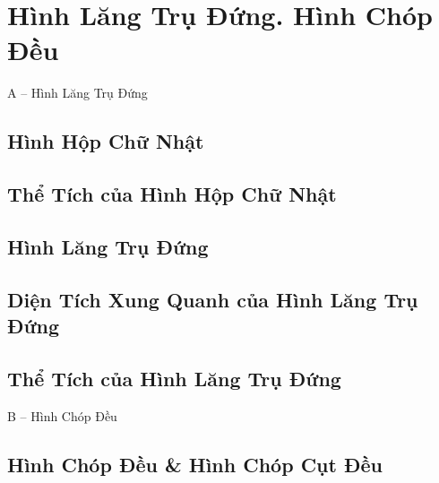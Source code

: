 \documentclass{article}
\numberwithin{equation}{section}
\begin{document}
\section{Hình Lăng Trụ Đứng. Hình Chóp Đều}

\begin{center}
	\Large A -- Hình Lăng Trụ Đứng
\end{center}

\subsection{Hình Hộp Chữ Nhật}


\subsection{Thể Tích của Hình Hộp Chữ Nhật}


\subsection{Hình Lăng Trụ Đứng}


\subsection{Diện Tích Xung Quanh của Hình Lăng Trụ Đứng}


\subsection{Thể Tích của Hình Lăng Trụ Đứng}


\begin{center}
	\Large B -- Hình Chóp Đều
\end{center}

\subsection{Hình Chóp Đều \& Hình Chóp Cụt Đều}
\end{document}
